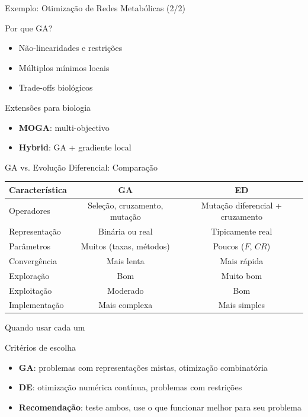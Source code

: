 \begin{frame}{Exemplo: Otimização de Redes Metabólicas (2/2)}
\begin{block}{Por que GA?}
\begin{itemize}
    \item Não-linearidades e restrições
    \item Múltiplos mínimos locais
    \item Trade-offs biológicos
\end{itemize}
\end{block}

\vspace{0.3cm}
\begin{block}{Extensões para biologia}
\begin{itemize}
    \item \textbf{MOGA}: multi-objectivo
    \item \textbf{Hybrid}: GA + gradiente local
\end{itemize}
\end{block}
\end{frame}

\begin{frame}[shrink=10]{GA vs. Evolução Diferencial: Comparação}
\begin{center}
\scriptsize
\begin{tabular}{lcc}
\toprule
\textbf{Característica} & \textbf{GA} & \textbf{ED} \\
\midrule
Operadores & Seleção, cruzamento, mutação & Mutação diferencial + cruzamento \\
Representação & Binária ou real & Tipicamente real \\
Parâmetros & Muitos (taxas, métodos) & Poucos ($F$, $CR$) \\
Convergência & Mais lenta & Mais rápida \\
Exploração & Bom & Muito bom \\
Exploitação & Moderado & Bom \\
Implementação & Mais complexa & Mais simples \\
\bottomrule
\end{tabular}
\end{center}
\end{frame}

\begin{frame}{Quando usar cada um}
\vspace{0.3cm}
\begin{block}{Critérios de escolha}
\begin{itemize}
    \item \textbf{GA}: problemas com representações mistas, otimização combinatória
    \item \textbf{DE}: otimização numérica contínua, problemas com restrições
    \item \textbf{Recomendação}: teste ambos, use o que funcionar melhor para seu problema
\end{itemize}
\end{block}
\end{frame}

